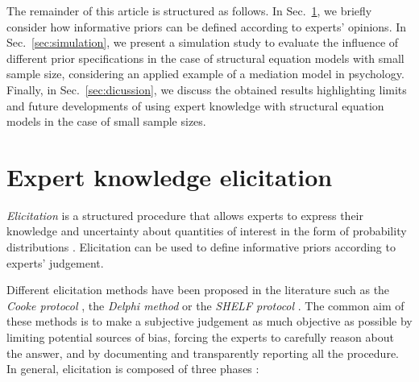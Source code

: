 \documentclass[graybox]{svmult}
\begin{document}
The remainder of this article is structured as follows. In Sec.~\ref{sec:expert_elicitation}, we briefly consider how informative priors can be defined according to experts' opinions. In Sec.~\ref{sec:simulation}, we present a simulation study to evaluate the influence of different prior specifications in the case of structural equation models with small sample size, considering an applied example of a mediation model in psychology. Finally, in Sec.~\ref{sec:dicussion}, we discuss the obtained results highlighting limits and future developments of using expert knowledge with structural equation models in the case of  small sample sizes.

\section{Expert knowledge elicitation}
\label{sec:expert_elicitation}

\emph{Elicitation} is a structured procedure that allows experts to express their knowledge and uncertainty about quantities of interest in the form of probability distributions \cite{ohaganExpertKnowledgeElicitation2019}. Elicitation can be used to define informative priors according to  experts' judgement.

Different elicitation methods have been proposed in the literature such as the \emph{Cooke protocol} \cite{cookeExpertsUncertaintyOpinion1991}, the \emph{Delphi method} \cite{roweDelphiTechniqueForecasting1999} or the \emph{SHELF protocol} \cite{oakleySHELFSheffieldElicitation2016}. The common aim of these methods is to make a subjective judgement as much objective as possible by limiting potential sources of bias, forcing the experts to carefully reason about the answer, and by documenting and transparently reporting all the procedure. In general, elicitation is composed of three phases \cite{ohaganUncertainJudgementsEliciting2006}:
\end{document}
